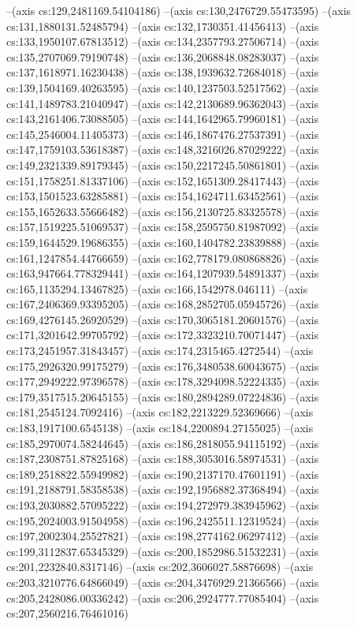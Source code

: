 --(axis cs:129,2481169.54104186)
--(axis cs:130,2476729.55473595)
--(axis cs:131,1880131.52485794)
--(axis cs:132,1730351.41456413)
--(axis cs:133,1950107.67813512)
--(axis cs:134,2357793.27506714)
--(axis cs:135,2707069.79190748)
--(axis cs:136,2068848.08283037)
--(axis cs:137,1618971.16230438)
--(axis cs:138,1939632.72684018)
--(axis cs:139,1504169.40263595)
--(axis cs:140,1237503.52517562)
--(axis cs:141,1489783.21040947)
--(axis cs:142,2130689.96362043)
--(axis cs:143,2161406.73088505)
--(axis cs:144,1642965.79960181)
--(axis cs:145,2546004.11405373)
--(axis cs:146,1867476.27537391)
--(axis cs:147,1759103.53618387)
--(axis cs:148,3216026.87029222)
--(axis cs:149,2321339.89179345)
--(axis cs:150,2217245.50861801)
--(axis cs:151,1758251.81337106)
--(axis cs:152,1651309.28417443)
--(axis cs:153,1501523.63285881)
--(axis cs:154,1624711.63452561)
--(axis cs:155,1652633.55666482)
--(axis cs:156,2130725.83325578)
--(axis cs:157,1519225.51069537)
--(axis cs:158,2595750.81987092)
--(axis cs:159,1644529.19686355)
--(axis cs:160,1404782.23839888)
--(axis cs:161,1247854.44766659)
--(axis cs:162,778179.080868826)
--(axis cs:163,947664.778329441)
--(axis cs:164,1207939.54891337)
--(axis cs:165,1135294.13467825)
--(axis cs:166,1542978.046111)
--(axis cs:167,2406369.93395205)
--(axis cs:168,2852705.05945726)
--(axis cs:169,4276145.26920529)
--(axis cs:170,3065181.20601576)
--(axis cs:171,3201642.99705792)
--(axis cs:172,3323210.70071447)
--(axis cs:173,2451957.31843457)
--(axis cs:174,2315465.4272544)
--(axis cs:175,2926320.99175279)
--(axis cs:176,3480538.60043675)
--(axis cs:177,2949222.97396578)
--(axis cs:178,3294098.52224335)
--(axis cs:179,3517515.20645155)
--(axis cs:180,2894289.07224836)
--(axis cs:181,2545124.7092416)
--(axis cs:182,2213229.52369666)
--(axis cs:183,1917100.6545138)
--(axis cs:184,2200894.27155025)
--(axis cs:185,2970074.58244645)
--(axis cs:186,2818055.94115192)
--(axis cs:187,2308751.87825168)
--(axis cs:188,3053016.58974531)
--(axis cs:189,2518822.55949982)
--(axis cs:190,2137170.47601191)
--(axis cs:191,2188791.58358538)
--(axis cs:192,1956882.37368494)
--(axis cs:193,2030882.57095222)
--(axis cs:194,272979.383945962)
--(axis cs:195,2024003.91504958)
--(axis cs:196,2425511.12319524)
--(axis cs:197,2002304.25527821)
--(axis cs:198,2774162.06297412)
--(axis cs:199,3112837.65345329)
--(axis cs:200,1852986.51532231)
--(axis cs:201,2232840.8317146)
--(axis cs:202,3606027.58876698)
--(axis cs:203,3210776.64866049)
--(axis cs:204,3476929.21366566)
--(axis cs:205,2428086.00336242)
--(axis cs:206,2924777.77085404)
--(axis cs:207,2560216.76461016)
